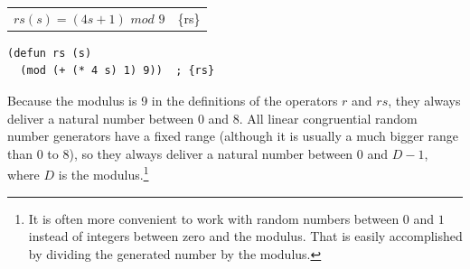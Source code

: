 \begin{center}
\begin{tabular}{ll}
$rs(s) = (4s + 1)$ $mod$ $9$ & \{rs\}\\
\end{tabular}
\end{center}

\begin{Verbatim}
(defun rs (s)
  (mod (+ (* 4 s) 1) 9))  ; {rs}
\end{Verbatim}

Because the modulus is 9 in the definitions of the operators
$r$ and $rs$, they always deliver a natural number between 0 and 8.
All linear congruential random number generators
have a fixed range (although it is usually a much bigger range than 0 to 8),
so they always deliver
a natural number between 0 and $D-1$, where $D$ is the modulus.\footnote{It
is often more convenient to work with random numbers between $0$ and $1$
instead of integers between zero and the modulus.
That is easily accomplished by dividing the generated number
by the modulus.}

